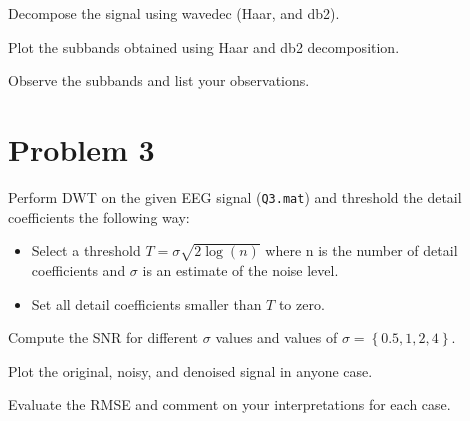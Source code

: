 \begin{tcolorbox}[colback=green!5!white,colframe=green!75!black,title=Problem 2.b]
    Decompose the signal using wavedec (Haar, and db2).
\end{tcolorbox}

\begin{tcolorbox}[colback=green!5!white,colframe=green!75!black,title=Problem 2.c]
    Plot the subbands obtained using Haar and db2 decomposition.
\end{tcolorbox}

\begin{tcolorbox}[colback=green!5!white,colframe=green!75!black,title=Problem 2.d]
    Observe the subbands and list your observations.
\end{tcolorbox}




\section*{Problem 3} \label{sec:problem3}

\begin{tcolorbox}[colback=blue!5!white,boxrule=0pt,frame empty]
    Perform DWT on the given EEG signal (\verb|Q3.mat|) and threshold the detail coefficients
    the following way:
    \vspace{0.5em}
    \begin{itemize}
        \item Select a threshold $T = \sigma \sqrt{2 \log(n)}$ where n is the number of detail coefficients 
        and $\sigma$ is an estimate of the noise level.
        \item Set all detail coefficients smaller than $T$ to zero.
    \end{itemize}
\end{tcolorbox}


\vspace{0.5cm}

\begin{tcolorbox}[colback=blue!5!white,colframe=blue!75!black,title=Problem 3.a]
    Compute the SNR for different $\sigma$ values and values of $\sigma = \left \lbrace 0.5, 1, 2, 4 \right \rbrace$.
\end{tcolorbox}

\begin{tcolorbox}[colback=blue!5!white,colframe=blue!75!black,title=Problem 3.b]
    Plot the original, noisy, and denoised signal in anyone case.
\end{tcolorbox}


\begin{tcolorbox}[colback=blue!5!white,colframe=blue!75!black,title=Problem 3.c]
    Evaluate the RMSE and comment on your interpretations for each case.

\end{tcolorbox}

